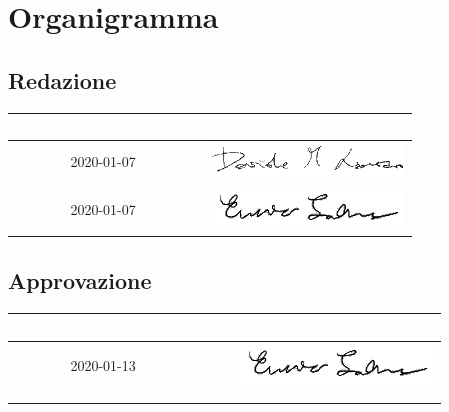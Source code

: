 \section{Organigramma}
\subsection{Redazione}
{
	\renewcommand{\arraystretch}{2}
	\begin{longtable}{ C{5cm} C{4cm} C{5cm} }
		\textcolor{white}{\textbf{Nome}} & \textcolor{white}{\textbf{Data di redazione}} & \textcolor{white}{\textbf{Firma}}\\	\endhead
        
        \LD{} & 2020-01-07 &
        \includegraphics[scale=0.60]{sezioni/Firme/Davide.png}  \\
        \SE{} & 2020-01-07 &
        \includegraphics[scale=0.70]{sezioni/Firme/Enrico.png}  \\
        		
	\end{longtable}
}

\subsection{Approvazione}
{
	\renewcommand{\arraystretch}{2}
	\centering
	\begin{longtable}{ C{5cm} C{4cm} C{5cm} }
		\textcolor{white}{\textbf{Nome}} & \textcolor{white}{\textbf{Data di Approvazione}} & \textcolor{white}{\textbf{Firma}}\\	\endhead
		
		
		\SE{} & 2020-01-13 &  
		\includegraphics[scale=0.70]{sezioni/Firme/Enrico.png}\\
		\VT{} &  & \\
		\CR{} & &  \\
		
	\end{longtable}
}

